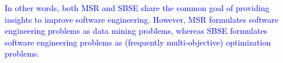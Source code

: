 \documentclass[sigconf,anonymous,review]{acmart}
\newcommand\llm[1]{\textcolor{blue}{#1\xspace}}
\begin{document}
\llm{In other words, both MSR and SBSE share the common goal of providing insights to improve software engineering. However, MSR formulates software engineering problems as data mining problems, whereas SBSE formulates software engineering problems as (frequently multi-objective) optimization problems.}



 
\end{document}
